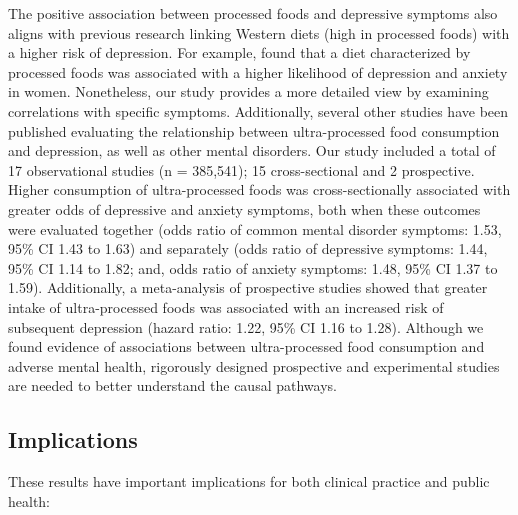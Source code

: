 \documentclass[jou]{apa7}
\begin{document}
	The positive association between processed foods and depressive symptoms also aligns with previous research linking Western diets (high in processed foods) with a higher risk of depression. For example, \parencite{laneUltraProcessedFoodConsumption2022} found that a diet characterized by processed foods was associated with a higher likelihood of depression and anxiety in women. Nonetheless, our study provides a more detailed view by examining correlations with specific symptoms. Additionally, several other studies have been published evaluating the relationship between ultra-processed food consumption and depression, as well as other mental disorders. Our study included a total of 17 observational studies (n = 385,541); 15 cross-sectional and 2 prospective. Higher consumption of ultra-processed foods was cross-sectionally associated with greater odds of depressive and anxiety symptoms, both when these outcomes were evaluated together (odds ratio of common mental disorder symptoms: 1.53, 95\% CI 1.43 to 1.63) and separately (odds ratio of depressive symptoms: 1.44, 95\% CI 1.14 to 1.82; and, odds ratio of anxiety symptoms: 1.48, 95\% CI 1.37 to 1.59). Additionally, a meta-analysis of prospective studies showed that greater intake of ultra-processed foods was associated with an increased risk of subsequent depression (hazard ratio: 1.22, 95\% CI 1.16 to 1.28). Although we found evidence of associations between ultra-processed food consumption and adverse mental health, rigorously designed prospective and experimental studies are needed to better understand the causal pathways.

	\subsection{Implications}\label{implicaciones}

	These results have important implications for both clinical practice and public health:
\end{document}
